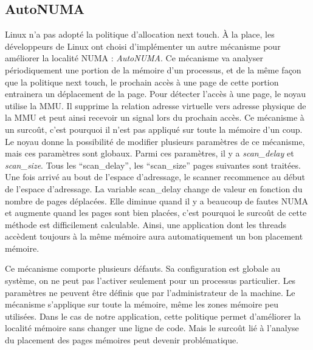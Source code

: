 \subsection{AutoNUMA}
\label{sec:autonuma}
Linux n'a pas adopté la politique d'allocation next touch.
%
\`A la place, les développeurs de Linux ont choisi d'implémenter un autre mécanisme pour améliorer la localité NUMA : {\em AutoNUMA}.
%
Ce mécanisme va analyser périodiquement une portion de la mémoire d'un processus, et de la même façon que la politique next touch, le prochain accès à une page de cette portion entrainera un déplacement de la page.
%
Pour détecter l'accès à une page, le noyau utilise la MMU.
%
Il supprime la relation adresse virtuelle vers adresse physique de la MMU et peut ainsi recevoir un signal lors du prochain accès.
%
Ce mécanisme à un surcoût, c'est pourquoi il n'est pas appliqué sur toute la mémoire d'un coup.
%
Le noyau donne la possibilité de modifier plusieurs paramètres de ce mécanisme, mais ces paramètres sont globaux.
%
Parmi ces paramètres, il y a {\em scan\_delay} et {\em scan\_size}.
%
Tous les ``scan\_delay'', les ``scan\_size'' pages suivantes sont traitées.
%
Une fois arrivé au bout de l'espace d'adressage, le scanner recommence au début de l'espace d'adressage.
%
La variable scan\_delay change de valeur en fonction du nombre de pages déplacées.
%
Elle diminue quand il y a beaucoup de fautes NUMA et augmente quand les pages sont bien placées, c'est pourquoi le surcoût de cette méthode est difficilement calculable.
%
Ainsi, une application dont les threads accèdent toujours à la même mémoire aura automatiquement un bon placement mémoire.

Ce mécanisme comporte plusieurs défauts.
%
Sa configuration est globale au système, on ne peut pas l'activer seulement pour un processus particulier.
%
Les paramètres ne peuvent être définis que par l'administrateur de la machine.
%
Le mécanisme s'applique sur toute la mémoire, même les zones mémoire peu utilisées.
%
Dans le cas de notre application, cette politique permet d'améliorer la localité mémoire sans changer une ligne de code.
%
Mais le surcoût lié à l'analyse du placement des pages mémoires peut devenir problématique.
